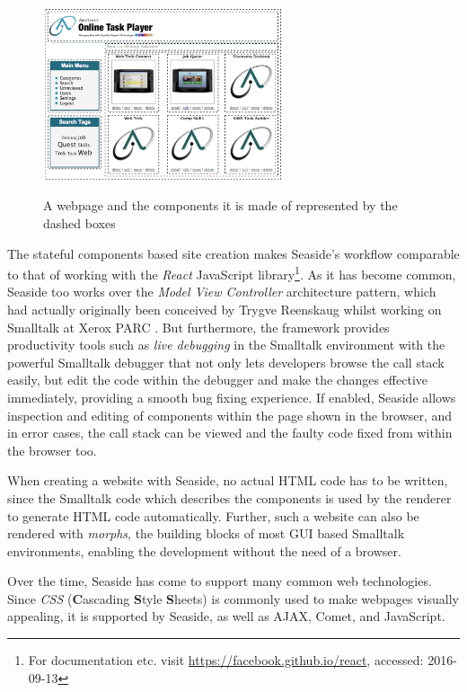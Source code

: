 \documentclass[a4paper,12pt,pagesize,headsepline,oribibl,titlepage]{scrartcl}
\begin{document}
\begin{figure}[h]
\begin{center}
\includegraphics*[width=0.63\textwidth]{images/components.png}\\
\caption{A webpage and the components it is made of represented by the dashed boxes}
\label{abb:comps}
\end{center}
\end{figure}

The stateful components based site creation makes Seaside's workflow comparable to that of working with the \emph{React} JavaScript library\footnote{For documentation etc. visit \url{https://facebook.github.io/react}, accessed: 2016-09-13}. As it has become common, Seaside too works over the \emph{Model View Controller} architecture pattern, which had actually originally been conceived by Trygve Reenskaug whilst working on Smalltalk at Xerox PARC \cite{reenskaug1979original}. But furthermore, the framework provides productivity tools such as \emph{live debugging} in the Smalltalk environment with the powerful Smalltalk debugger that not only lets developers browse the call stack easily, but edit the code within the debugger and make the changes effective immediately, providing a smooth bug fixing experience. If enabled, Seaside allows inspection and editing of components within the page shown in the browser, and in error cases, the call stack can be viewed and the faulty code fixed from within the browser too.

When creating a website with Seaside, no actual HTML code has to be written, since the Smalltalk code which describes the components is used by the renderer to generate HTML code automatically. Further, such a website can also be rendered with \emph{morphs}, the building blocks of most GUI based Smalltalk environments, enabling the development without the need of a browser. 

Over the time, Seaside has come to support many common web technologies. Since \emph{CSS} (\textbf{C}ascading \textbf{S}tyle \textbf{S}heets) is commonly used to make webpages visually  appealing, it is supported by Seaside, as well as AJAX, Comet, and JavaScript.
\end{document}
